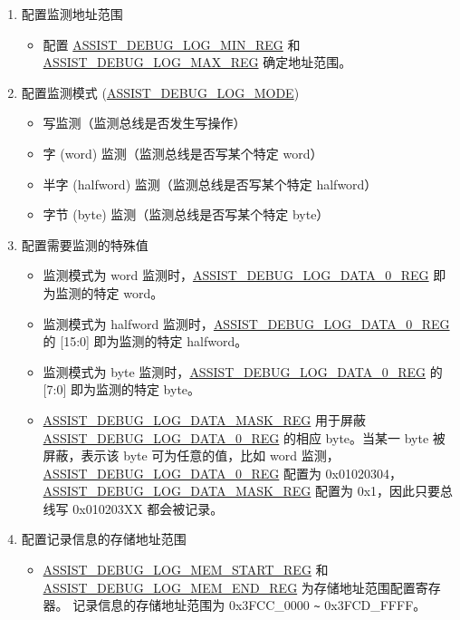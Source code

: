 \documentclass[main\_\_CN.tex]{subfiles}
\begin{document}
\begin{enumerate}
    \item 配置监测地址范围
        \begin{itemize}
            \item 配置 \hyperref[regdesc:ASSISTDEBUGLOGMINREG]{ASSIST\_DEBUG\_LOG\_MIN\_REG} 和 \hyperref[regdesc:ASSISTDEBUGLOGMAXREG]{ASSIST\_DEBUG\_LOG\_MAX\_REG} 确定地址范围。
        \end{itemize}
    \item 配置监测模式 (\hyperref[fielddesc:ASSISTDEBUGLOGMODE]{ASSIST\_DEBUG\_LOG\_MODE})
       \begin{itemize}
            \item 写监测（监测总线是否发生写操作）
           \item 字 (word) 监测（监测总线是否写某个特定 word）
           \item 半字 (halfword) 监测（监测总线是否写某个特定 halfword）
           \item 字节 (byte) 监测（监测总线是否写某个特定 byte）
       \end{itemize}
    \item 配置需要监测的特殊值
        \begin{itemize}
            \item 监测模式为 word 监测时，\hyperref[regdesc:ASSISTDEBUGLOGDATA0REG]{ASSIST\_DEBUG\_LOG\_DATA\_0\_REG} 即为监测的特定 word。
            \item 监测模式为 halfword 监测时，\hyperref[regdesc:ASSISTDEBUGLOGDATA0REG]{ASSIST\_DEBUG\_LOG\_DATA\_0\_REG} 的 [15:0] 即为监测的特定 halfword。
            \item 监测模式为 byte 监测时，\hyperref[regdesc:ASSISTDEBUGLOGDATA0REG]{ASSIST\_DEBUG\_LOG\_DATA\_0\_REG} 的 [7:0] 即为监测的特定 byte。
            \item \hyperref[regdesc:ASSISTDEBUGLOGDATAMASKREG]{ASSIST\_DEBUG\_LOG\_DATA\_MASK\_REG} 用于屏蔽 \hyperref[regdesc:ASSISTDEBUGLOGDATA0REG]{ASSIST\_DEBUG\_LOG\_DATA\_0\_REG} 的相应 byte。当某一 byte 被屏蔽，表示该 byte 可为任意的值，比如 word 监测，\hyperref[regdesc:ASSISTDEBUGLOGDATA0REG]{ASSIST\_DEBUG\_LOG\_DATA\_0\_REG} 配置为 0x01020304，\hyperref[regdesc:ASSISTDEBUGLOGDATAMASKREG]{ASSIST\_DEBUG\_LOG\_DATA\_MASK\_REG} 配置为 0x1，因此只要总线写 0x010203XX 都会被记录。
        \end{itemize}
    \item 配置记录信息的存储地址范围
        \begin{itemize}
            \item \hyperref[regdesc:ASSISTDEBUGLOGMEMSTARTREG]{ASSIST\_DEBUG\_LOG\_MEM\_START\_REG} 和 \hyperref[regdesc:ASSISTDEBUGLOGMEMENDREG]{ASSIST\_DEBUG\_LOG\_MEM\_END\_REG} 为存储地址范围配置寄存器。 记录信息的存储地址范围为 0x3FCC\_0000 \verb+~+ 0x3FCD\_FFFF。

\end{itemize}
\end{enumerate}
\end{document}

